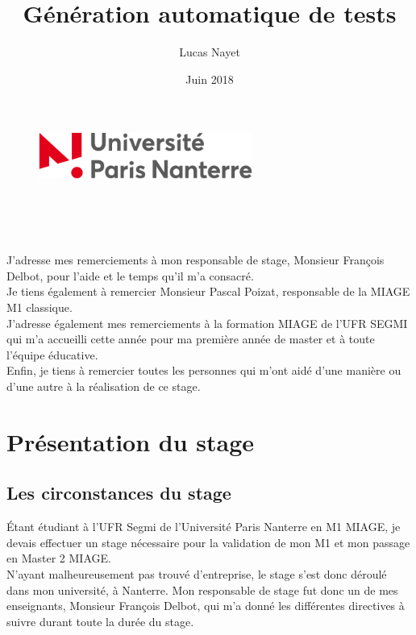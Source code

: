 \documentclass[12pt,twoside]{report}
\title{Génération automatique de tests}
\author{Lucas Nayet}
\date{Juin 2018}
\begin{document}
\makeatletter 
\begin{titlepage} 
\centering  
\vfill 
\begin{figure}[h]
\includegraphics[width = 70mm]{UPN-logo.jpg}
\end{figure}
\vspace{1.6cm}
{\LARGE {\@title}}\\ 
\vspace{1.6cm}
{\large \@author}\\ 
\vspace{1cm} {\large \@date}\\
\vfill
\end{titlepage} 
\makeatother

\thispagestyle{empty}
\setcounter{page}{0}
J'adresse mes remerciements à mon responsable de stage, Monsieur François Delbot, pour l'aide et le temps qu'il m'a consacré.\\
Je tiens également à remercier Monsieur Pascal Poizat, responsable de la MIAGE M1 classique.\\
J'adresse également mes remerciements à la formation MIAGE de l'UFR SEGMI qui m'a accueilli cette année pour ma première année de master et à toute l'équipe éducative.\\
Enfin, je tiens à remercier toutes les personnes qui m'ont aidé d'une manière ou d'une autre à la réalisation de ce stage.

\tableofcontents

\color{red}
\chapter{Présentation du stage}
\color{black}
\section {Les circonstances du stage}
Étant étudiant à l'UFR Segmi de l'Université Paris Nanterre en M1 MIAGE, je devais effectuer un stage nécessaire pour la validation de mon M1 et mon passage en Master 2 MIAGE.\\ 
N'ayant malheureusement pas trouvé d'entreprise, le stage s'est donc déroulé dans mon université, à Nanterre. Mon responsable de stage fut donc un de mes enseignants, Monsieur François Delbot, qui m'a donné les différentes directives à suivre durant toute la durée du stage.
\end{document}
